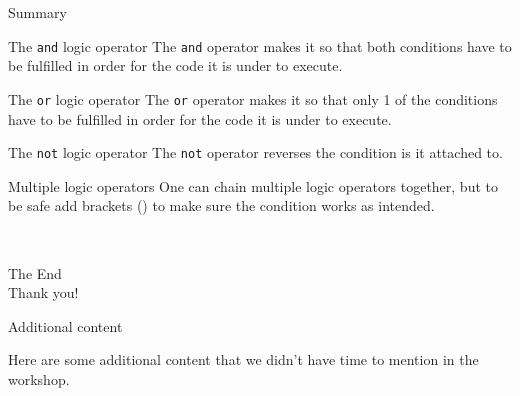 \documentclass[dvipsnames, svgnames, x11names]{beamer}
\begin{document}
\begin{frame}[fragile]{Summary}
\begin{block}{The \texttt{and} logic operator}
The \texttt{and} operator makes it so that both conditions have to be fulfilled in order for the code it is under to execute.
\end{block}
\begin{block}{The \texttt{or} logic operator}
The \texttt{or} operator makes it so that only 1 of the conditions have to be fulfilled in order for the code it is under to execute.
\end{block}
\begin{block}{The \texttt{not} logic operator}
The \texttt{not} operator reverses the condition is it attached to.
\end{block}
\begin{alertblock}{Multiple logic operators}
One can chain multiple logic operators together, but to be safe add brackets () to make sure the condition works as intended.
\end{alertblock}
\end{frame}

\begin{frame}{ \ }
	\begin{center}
		The End\\
		Thank you!
	\end{center}
\end{frame}






\setcounter{framenumber}{0}











\begin{frame}{Additional content}
	\begin{center}
		Here are some additional content that we didn't have time to mention in the workshop.
	\end{center}
\end{frame}
\end{document}
